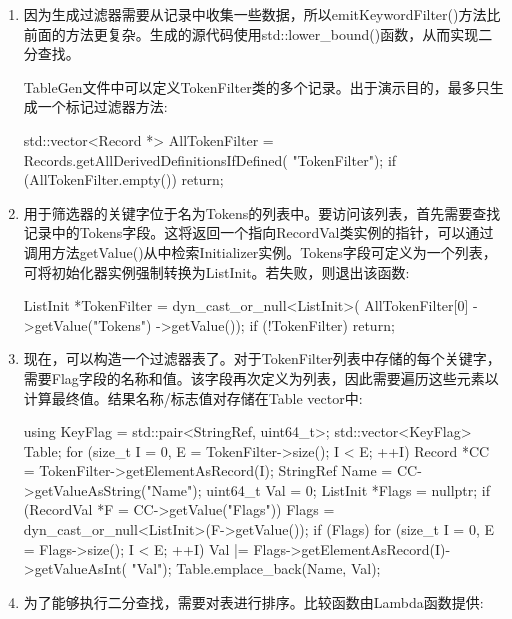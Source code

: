 \begin{enumerate}
\item
因为生成过滤器需要从记录中收集一些数据，所以emitKeywordFilter()方法比前面的方法更复杂。生成的源代码使用std::lower\_bound()函数，从而实现二分查找。

TableGen文件中可以定义TokenFilter类的多个记录。出于演示目的，最多只生成一个标记过滤器方法:

\begin{cpp}
    std::vector<Record *> AllTokenFilter =
        Records.getAllDerivedDefinitionsIfDefined(
            "TokenFilter");
    if (AllTokenFilter.empty())
        return;
\end{cpp}

\item
用于筛选器的关键字位于名为Tokens的列表中。要访问该列表，首先需要查找记录中的Tokens字段。这将返回一个指向RecordVal类实例的指针，可以通过调用方法getValue()从中检索Initializer实例。Tokens字段可定义为一个列表，可将初始化器实例强制转换为ListInit。若失败，则退出该函数:

\begin{cpp}
    ListInit *TokenFilter = dyn_cast_or_null<ListInit>(
        AllTokenFilter[0]
            ->getValue("Tokens")
            ->getValue());
    if (!TokenFilter)
        return;
\end{cpp}

\item
现在，可以构造一个过滤器表了。对于TokenFilter列表中存储的每个关键字，需要Flag字段的名称和值。该字段再次定义为列表，因此需要遍历这些元素以计算最终值。结果名称/标志值对存储在Table vector中:

\begin{cpp}
    using KeyFlag = std::pair<StringRef, uint64_t>;
    std::vector<KeyFlag> Table;
    for (size_t I = 0, E = TokenFilter->size(); I < E;
            ++I) {
        Record *CC = TokenFilter->getElementAsRecord(I);
        StringRef Name = CC->getValueAsString("Name");
        uint64_t Val = 0;
        ListInit *Flags = nullptr;
        if (RecordVal *F = CC->getValue("Flags"))
            Flags = dyn_cast_or_null<ListInit>(F->getValue());
        if (Flags) {
            for (size_t I = 0, E = Flags->size(); I < E; ++I) {
                Val |=
                Flags->getElementAsRecord(I)->getValueAsInt(
                "Val");
            }
        }
        Table.emplace_back(Name, Val);
    }
\end{cpp}

\item
为了能够执行二分查找，需要对表进行排序。比较函数由Lambda函数提供:


\end{enumerate}
